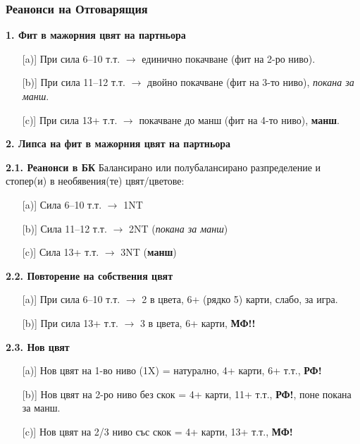 \documentclass[10pt,a5paper]{extarticle}
\begin{document}

\subsubsection*{Реанонси на Отговарящия}

\textbf{1. Фит в мажорния цвят на партньора}
\begin{itemize}
    \item[][a)] При сила 6–10 т.т. $\rightarrow$ единично покачване (фит на 2-ро ниво).
    \item[][b)] При сила 11–12 т.т. $\rightarrow$ двойно покачване (фит на 3-то ниво), \emph{покана за манш}.
    \item[][c)] При сила 13+ т.т. $\rightarrow$ покачване до манш (фит на 4-то ниво), \textbf{манш}.
\end{itemize}

\textbf{2. Липса на фит в мажорния цвят на партньора}

\textbf{2.1. Реанонси в БК}
Балансирано или полубалансирано разпределение и стопер(и) в необявения(те) цвят/цветове:  
\begin{itemize}
    \item[][a)] Сила 6–10 т.т. $\rightarrow$ 1NT
    \item[][b)] Сила 11–12 т.т. $\rightarrow$ 2NT (\emph{покана за манш})
    \item[][c)] Сила 13+ т.т. $\rightarrow$ 3NT (\textbf{манш})
\end{itemize}

\textbf{2.2. Повторение на собствения цвят}
\begin{itemize}
    \item[][a)] При сила 6–10 т.т. $\rightarrow$ 2 в цвета, 6+ (рядко 5) карти, слабо, за игра.
    \item[][b)] При сила 13+ т.т. $\rightarrow$ 3 в цвета, 6+ карти, \textbf{МФ!!}
\end{itemize}


\textbf{2.3. Нов цвят}
\begin{itemize}
    \item[][a)] Нов цвят на 1-во ниво (1X) = натурално, 4+ карти, 6+ т.т., \textbf{РФ!}
    \item[][b)] Нов цвят на 2-ро ниво без скок = 4+ карти, 11+ т.т., \textbf{РФ!}, поне покана за манш.
    \item[][c)] Нов цвят на 2/3 ниво със скок = 4+ карти, 13+ т.т., \textbf{МФ!}
\end{itemize}
\end{document}
